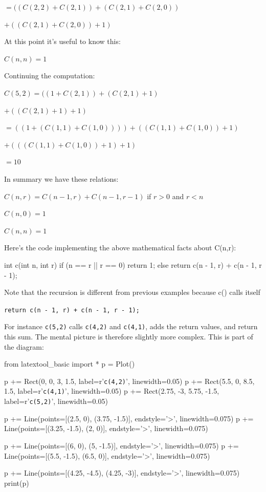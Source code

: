 $= ((C(2, 2) + C(2, 1)) + (C(2,1) + C(2,0))$

$+ ((C(2, 1) + C(2, 0)) + 1)$

At this point it's useful to know this:

$C(n, n) = 1$

Continuing the computation:

$C(5, 2) = ((1 + C(2, 1)) + (C(2,1) + 1)$

$+ ((C(2, 1) + 1) + 1)$

$= ((1 + (C(1, 1) + C(1, 0)))) + ((C(1, 1) + C(1, 0)) + 1)$

$+ (((C(1, 1) + C(1, 0)) + 1) + 1)$

$= 10$

In summary we have these relations:

$C(n, r) = C(n - 1, r) + C(n - 1, r - 1)$ if $r > 0$ and $r < n$

$C(n, 0) = 1$

$C(n, n) = 1$

Here's the code implementing the above mathematical
facts about C(n,r):

\begin{consolethree}[escapeinside=||]
int c(int n, int r)
{
    if (n == r || r == 0)
    {
        return 1;
    }
    else
    {
        return c(n - 1, r) + c(n - 1, r - 1);
    }
}
\end{consolethree}

Note that the recursion is different from previous examples because c()
calls itself 

\verb!return c(n - 1, r) + c(n - 1, r - 1);!

For instance \texttt{c(5,2)} calls \texttt{c(4,2)} and \texttt{c(4,1)}, adds
the return values, and return this sum. The mental picture is therefore
slightly more complex. This is part of the diagram:

\begin{python}
from latextool_basic import *
p = Plot()

p += Rect(0, 0, 3, 1.5, label=r'\texttt{c(4,2)}', linewidth=0.05)
p += Rect(5.5, 0, 8.5, 1.5, label=r'\texttt{c(4,1)}', linewidth=0.05)
p += Rect(2.75, -3, 5.75, -1.5, label=r'\texttt{c(5,2)}', linewidth=0.05)

p += Line(points=[(2.5, 0), (3.75, -1.5)], endstyle='>', linewidth=0.075)
p += Line(points=[(3.25, -1.5), (2, 0)], endstyle='>', linewidth=0.075)

p += Line(points=[(6, 0), (5, -1.5)], endstyle='>', linewidth=0.075)
p += Line(points=[(5.5, -1.5), (6.5, 0)], endstyle='>', linewidth=0.075)

p += Line(points=[(4.25, -4.5), (4.25, -3)], endstyle='>', linewidth=0.075)
print(p)
\end{python}

